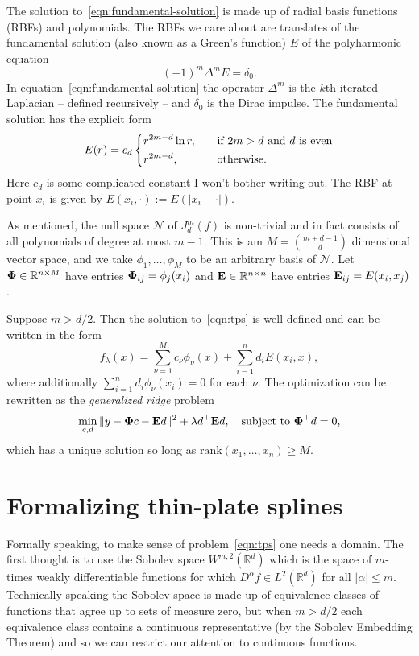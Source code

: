 \documentclass{article}
\newcommand{\mc}[1]{\mathcal{#1}}
\newcommand{\Reals}{\mathbb{R}} %
\newcommand{\Rd}{\Reals^d}
\newcommand{\1}{\mathbf{1}}
\begin{document}
The solution to~\eqref{eqn:fundamental-solution} is made up of radial basis functions (RBFs) and polynomials. The RBFs we care about are translates of the fundamental solution (also known as a Green's function) $E$ of the polyharmonic equation
\begin{equation}
\label{eqn:fundamental-solution}
(-1)^m\Delta^{m} E = \delta_0.
\end{equation}
In equation~\eqref{eqn:fundamental-solution} the operator $\Delta^{m}$ is the $k$th-iterated Laplacian -- defined recursively -- and $\delta_0$ is the Dirac impulse. The fundamental solution has the explicit form
\begin{equation*}
E(r) =  c_d 
\begin{dcases}
r^{2m - d} \ln r, \quad & \textrm{if $2m > d$ and $d$ is even} \\
r^{2m - d}, \quad & \textrm{otherwise.}
\end{dcases}
\end{equation*}
Here $c_d$ is some complicated constant I won't bother writing out. The RBF at point $x_i$ is given by $E(x_i,\cdot) := E(|x_i - \cdot|)$. 

As mentioned, the null space $\mc{N}$ of $J_d^m(f)$ is non-trivial and in fact consists of all polynomials of degree at most $m - 1$. This is am $M = {m + d - 1\choose d}$ dimensional vector space, and we take $\phi_{1},\ldots,\phi_M$ to be an arbitrary basis of $\mc{N}$. Let ${\bf \Phi} \in \Reals^{n \times M}$ have entries ${\bf \Phi}_{ij} = \phi_j(x_i)$ and ${\bf E} \in \Reals^{n \times n}$ have entries ${\bf E}_{ij} = E(x_i,x_j)$. 
\begin{theorem}
	\label{thm:tps-representer}
	Suppose $m > d/2$. Then the solution to~\eqref{eqn:tps} is well-defined and can be written in the form 
	$$f_{\lambda}(x) = \sum_{\nu = 1}^{M} c_{\nu} \phi_{\nu}(x) + \sum_{i = 1}^{n} d_i E(x_i,x),$$ 
	where additionally $\sum_{i = 1}^{n} d_i \phi_{\nu}(x_i) = 0$ for each $\nu$. The optimization can be rewritten as the \emph{generalized ridge} problem
	\begin{equation}
	\label{eqn:tps-ridge}
	\min_{c,d} \|y - {\bf \Phi} c - {\bf E} d\|^2 + \lambda d^{\top} {\bf E} d, \quad \textrm{subject to ${\bf \Phi}^{\top}d = 0$,}
	\end{equation}
	which has a unique solution so long as $\mathrm{rank}(x_1,\ldots,x_n) \geq M$.
\end{theorem}

\section{Formalizing thin-plate splines}
Formally speaking, to make sense of problem~\eqref{eqn:tps} one needs a domain. The first thought is to use the Sobolev space $W^{m,2}(\Rd)$ which is the space of $m$-times weakly differentiable functions for which $D^{\alpha}f \in L^2(\Rd)$ for all $|\alpha| \leq m$. Technically speaking the Sobolev space is made up of equivalence classes of functions that agree up to sets of measure zero, but when $m > d/2$ each equivalence class contains a continuous representative (by the Sobolev Embedding Theorem) and so we can restrict our attention to continuous functions.  
\end{document}
